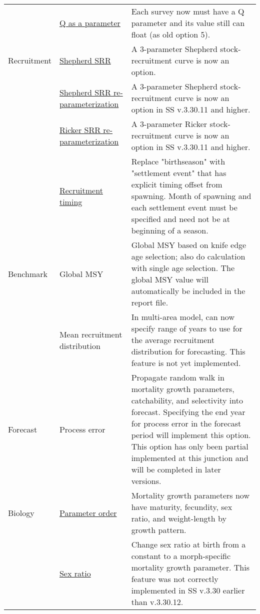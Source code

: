 \begin{center}
{\begin{longtable}{p{2cm} p{3cm} p{10cm}}
			& \multicolumn{1}{l}{\hyperlink{Qsetup}{Q as a parameter}} & 
				Each survey now must have a Q parameter and its value still can float (as old option 5).\\

		Recruitment
			& \hyperlink{Shepherd}{Shepherd SRR} & 
				A 3-parameter Shepherd stock-recruitment curve is now an option.\\

			& \hyperlink{Shepherd2}{Shepherd SRR re-parameterization} & 
				A 3-parameter Shepherd stock-recruitment curve is now an option in SS v.3.30.11 and higher.\\
			
			& \hyperlink{Ricker2}{Ricker SRR re-parameterization} & 
				A 3-parameter Ricker stock-recruitment curve is now an option in SS v.3.30.11 and higher.\\

			& \hyperlink{RecrTiming}{Recruitment timing} & 
				Replace "birthseason" with "settlement event" that has explicit timing offset from spawning. Month of spawning and each settlement event must be specified and need not be at beginning of a season.\\

		Benchmark 
			& Global MSY &  
				Global MSY based on knife edge age selection; also do calculation with single age selection. The global MSY value will automatically be included in the report file.\\
		
			& Mean recruitment distribution & 
				In multi-area model, can now specify range of years to use for the average recruitment distribution for forecasting. This feature is not yet implemented. \\

		Forecast & 
			Process error & 
				Propagate random walk in mortality growth parameters, catchability, and selectivity into forecast. Specifying the end year for process error in the forecast period will implement this option.  This option has only been partial implemented at this junction and will be completed in later versions.\\

		Biology 
			& \hyperlink{MGorder}{Parameter order} & 
				Mortality growth parameters now have maturity, fecundity, sex ratio, and weight-length by growth pattern.\\
				
		    & \hyperlink{SexRatio}{Sex ratio} & 
			    Change sex ratio at birth from a constant to a morph-specific mortality growth parameter. This feature was not correctly implemented in SS v.3.30 earlier than v.3.30.12. \\


\end{longtable}}
\end{center}
